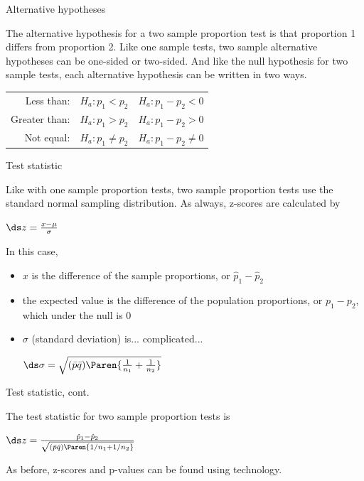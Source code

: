 \documentclass[xcolor=table]{beamer}
\begin{document}
\begin{frame}{Alternative hypotheses}
\begin{block}{}
\large
The alternative hypothesis for a two sample proportion test is that proportion 1 differs from proportion 2. Like one sample tests, two sample alternative hypotheses can be one-sided or two-sided. And like the null hypothesis for two sample tests, each alternative hypothesis can be written in two ways.\\
\smallskip
{\centering 
\begin{tabular}{r c | c}
Less than: & $H_a: p_1 < p_2$ & $H_a: p_1 - p_2 < 0$\\
Greater than: & $H_a: p_1 > p_2$ & $H_a: p_1 - p_2 > 0$\\
Not equal: & $H_a: p_1 \ne p_2$ & $H_a: p_1 - p_2 \ne 0$
\end{tabular}
\par}

\end{block}
\end{frame}

\begin{frame}{Test statistic}
\begin{block}{}
\large
Like with one sample proportion tests, two sample proportion tests use the standard normal sampling distribution. As always, z-scores are calculated by\\
\medskip
{\centering $\ds z = \frac{x - \mu}{\sigma}$ \par}
\pause\medskip
In this case, 
\begin{itemize}
\pause\item $x$ is the difference of the sample proportions, or $\hat p_1 - \hat p_2$
\pause\item the expected value is the difference of the population proportions, or $p_1 - p_2$, which under the null is 0
\pause\item $\sigma$ (standard deviation) is... complicated...\\
\medskip
{\centering $\ds \sigma = \sqrt{(\bar p \bar q)\Paren{\frac {1}{n_1} + \frac {1}{n_2}}}$
\par}
\medskip
\end{itemize}
\end{block}
\end{frame}

\begin{frame}{Test statistic, cont.}
\begin{block}{}
\large
The test statistic for two sample proportion tests is\\
\medskip
{\centering $\ds z = \frac{\hat p_1 - \hat p_2}{\sqrt{(\bar p \bar q)\Paren{1/n_1 + 1/n_2}}}$ \par}
\medskip
As before, z-scores and p-values can be found using technology.
\end{block}
\end{frame}
\end{document}
